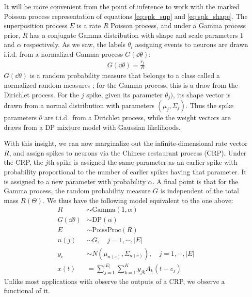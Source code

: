 
It will be more convenient from the point of inference to work with the marked Poisson process representation of equations \ref{eq:spk_sup} and \ref{eq:spk_shape}. 
The superposition process $E$ is a rate $R$ Poisson process,
and under a Gamma process prior, $R$ has a conjugate Gamma distribution with shape and scale parameters $1$ and $\alpha$ respectively.
As we saw, the labels $\theta_i$ assigning events to neurons are drawn i.i.d. from a normalized Gamma process $G(\dd \theta)$:
\begin{align}
 G(\dd \theta) = \frac{r_j}{R}
\end{align}
$G(\dd \theta)$ is a random probability measure that belongs to a class called a normalized random measures \citep{JamesLP09}; for the Gamma process, 
this is a draw from the Dirichlet process. For the $j$ spike, given its parameter $\theta_j)$, its shape vector is drawn from a normal distribution
with parameters $(\mu_{j}, \Sigma_{j})$. Thus the spike parameters $\theta$ are i.i.d.\ from a Dirichlet process, while the weight vectors are
draws from a DP mixture model with Gaussian likelihoods.

With this insight, we can now marginalize out the infinite-dimensional rate vector $R$, and assign spikes to neurons via
the Chinese restaurant process (CRP). Under the CRP, the $j$th spike is assigned the same parameter as an earlier spike with probability proportional 
to the number of earlier spikes having that parameter. It is assigned to a new parameter with probability $\alpha$.
A final point is that for the Gamma process, the random probability measure $G$ is independent of the total mass $R(\Theta)$. We thus have
 the following model equivalent to the one above:
\begin{align}
  R & \sim \text{Gamma}(1,\alpha) \\
  G(\dd \theta) & \sim \text{DP}(\alpha) \\
  E &\sim \text{PoissProc}(R) \\
  n(j) &\sim G, \quad j = 1,\cdots, |E| \\
  y_e &\sim N(\mu_{n(e)}, \Sigma_{n(e)}), \quad  j = 1,\cdots, |E| \\
  x(t) &=   \sum_{j=1}^{|E|} \sum_{k=1}^K y_{jk} A_k(t - e_{j})
\end{align}
Unlike most applications with observe the outputs of a CRP, we observe a functional of it.

